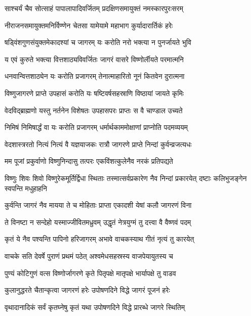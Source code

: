 \twolineshloka
{साश्चर्यं चैव सोत्साहं पापालापादिवर्जितम्}
{प्रदक्षिणसमायुक्तं नमस्कारपुरःसरम्}%

\twolineshloka
{नीराजनसमायुक्तमनिर्विण्णेन चेतसा}
{यामेयामे महाभाग कुर्यादारार्तिकं हरेः}%

\twolineshloka
{षड्विंशगुणसंयुक्तमेकादश्यां च जागरम्}
{यः करोति नरो भक्त्या न पुनर्जायते भुवि}%

\twolineshloka
{य एवं कुरुते भक्त्या वित्तशाठ्यविवर्जितः}
{जागरं वासरे विष्णोर्लीयते परमात्मनि}%

\twolineshloka
{धनवान्वित्तशाठ्येन यः करोति प्रजागरम्}
{तेनात्माहारितो नूनं कितवेन दुरात्मना}%

\twolineshloka
{विष्णुजागरणे प्राप्ते उपहासं करोति यः}
{षष्टिवर्षसहस्राणि विष्ठायां जायते कृमिः}%

\twolineshloka
{वेदविद्ब्राह्मणो यस्तु नर्तनेन विशेषतः}
{उपहासपरः प्राप्तः स वै चाण्डाल उच्यते}%

\twolineshloka
{निमिषं निमिषार्द्धं वा यः करोति प्रजागरम्}
{धर्मार्थकाममोक्षाणां प्राप्नोति पदमव्ययम्}%

\twolineshloka
{वेदशास्त्ररतो नित्यं नित्यं वै यज्ञयाजकः}
{रात्रौ जागरणे प्राप्ते निन्दां कुर्वन्व्रजत्यधः}%

\twolineshloka
{मम पूजां प्रकुर्वाणो विष्णुनिन्दासु तत्परः}
{एकविंशत्कुलेनैव नरकं प्रतिपद्यते}%

\threelineshloka
{विष्णुः शिवः शिवो विष्णुरेकमूर्तिर्द्विधा स्थिताः}
{तस्मात्सर्वप्रकारेण नैव निन्दां प्रकारयेत्}
{दष्टाः कलिभुजङ्गेन स्वपन्ति मधुहाहनि}%

\twolineshloka
{कुर्वन्ति जागरं नैव मायया ते च मोहिताः}
{प्राप्ता एकादशी येषां कलौ जागरणं विना}%

\twolineshloka
{ते विनष्टा न सन्देहो यस्माज्जीवितमध्रुवम्}
{उद्धृतं नेत्रयुग्मं तु दत्त्वा वै वैष्णवं पदम्}%

\twolineshloka
{कृतं ये नैव पश्यन्ति पापिनो हरिजागरम्}
{अभावे वाचकस्याथ गीतं नृत्यं तु कारयेत्}%

\twolineshloka
{वाचके सति देवर्षे पुराणं प्रथमं पठेत्}
{अश्वमेधसहस्रस्य वाजपेयायुतस्य च}%

\twolineshloka
{पुण्यं कोटिगुणं वत्स विष्णोर्जागरणे कृते}
{पितृपक्षे मातृपक्षे भार्यापक्षे तु वाडव}%

\twolineshloka
{कुलानुद्धरते चैतान्कृत्वा जागरणं हरेः}
{उपोषणदिने विद्धे जागरं पूजनं हरेः}%

\twolineshloka
{वृथादानादिकं सर्वं कृतघ्नेषु कृतं यथा}
{उपोषणदिने विद्धे प्रारब्धे जागरे स्थितिम्}%

